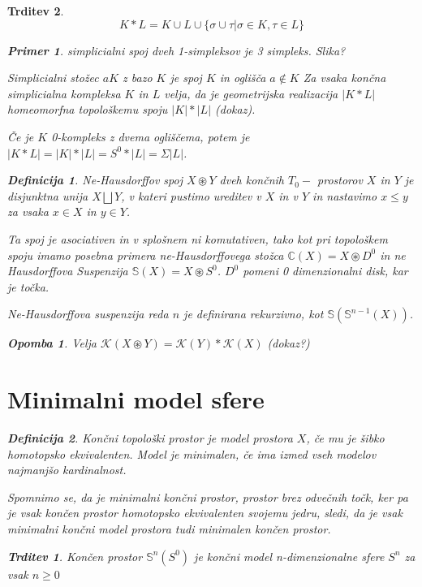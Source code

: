 \documentclass[a4paper,12pt]{article}
\DeclareRobustCommand{\k}{
    \mathcal{K}
}
\theoremstyle{definition}
\newtheorem{definicija}{Definicija}
\theoremstyle{plain}
\theoremstyle{definition}
\newtheorem{primer}{Primer}
\theoremstyle{plain}
\newtheorem{trditev}{Trditev}
\theoremstyle{plain}
\theoremstyle{plain}
\newtheorem{opomba}{Opomba}
\theoremstyle{plain}
\begin{document}
\begin{trditev}
$$
K\ast L=K\cup L \cup \{\sigma \cup \tau| \sigma \in K, \tau \in L \}
$$

\begin{primer}
    simplicialni spoj dveh 1-simpleksov je 3 simpleks. Slika?
\end{primer}

\textit{Simplicialni stožec} $aK$ z bazo $K$ je spoj $K$ in oglišča $a\notin K$
Za vsaka končna simplicialna kompleksa $K$ in $L$ velja, da je geometrijska realizacija $|K\ast L|$ homeomorfna topološkemu spoju $|K|\ast |L|$ (dokaz).

Če je $K$ 0-kompleks z dvema ogliščema, potem je $|K\ast L|=|K|\ast |L|=S^0\ast |L| = \Sigma |L|$.

\begin{definicija}
    \textit{Ne-Hausdorffov spoj} $X\circledast Y$ dveh končnih $T_0-$
    prostorov $X$ in $Y$ je disjunktna unija $X\bigsqcup Y$, v kateri
     pustimo ureditev v $X$ in v $Y$ in nastavimo $x\leq y$ za vsaka 
     $x\in X$ in $y\in Y$.
\end{definicija}
Ta spoj je asociativen in v splošnem ni komutativen, tako kot pri topološkem
 spoju imamo posebna primera ne-Hausdorffovega stožca $\mathds{C}(X)=X\circledast
  D^0$ in ne Hausdorffova Suspenzija $\mathds{S}(X)=X \circledast S^0$. 
  $D^0$ pomeni 0 dimenzionalni disk, kar je točka.

  Ne-Hausdorffova suspenzija reda $n$ je definirana rekurzivno, kot $\mathds{S}(\mathds{S}^{n-1}(X))$.
  \begin{opomba}
    \label{op:spoj}
    Velja $\k(X\circledast Y) = \k(Y)\ast \k(X)$ (dokaz?)
  \end{opomba}


\section{Minimalni model sfere}


\begin{definicija}
    Končni topološki prostor je \textit{model} prostora $X$, če mu je šibko homotopsko ekvivalenten. Model je \textit{minimalen}, če ima izmed vseh modelov najmanjšo kardinalnost.
\end{definicija}

Spomnimo se, da je minimalni končni prostor, prostor brez odvečnih točk, ker pa je vsak končen prostor homotopsko ekvivalenten svojemu jedru, sledi, da je vsak minimalni končni model prostora tudi minimalen končen prostor.

\begin{trditev}
    Končen prostor $\mathds{S}^n(S^0)$ je končni model n-dimenzionalne sfere $S^n$ za vsak $n\geq 0$
\end{trditev}


\end{trditev}
\end{document}
